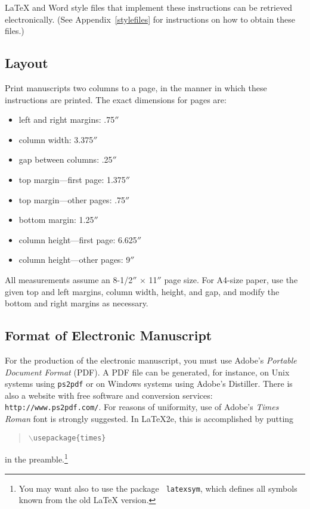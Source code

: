\documentclass{article}
\begin{document}
\LaTeX{} and Word style files that implement these instructions
can be retrieved electronically. (See Appendix~\ref{stylefiles} for
instructions on how to obtain these files.)

\subsection{Layout}

Print manuscripts two columns to a page, in the manner in which these
instructions are printed. The exact dimensions for pages are:
\begin{itemize}
\item left and right margins: .75$''$
\item column width: 3.375$''$
\item gap between columns: .25$''$
\item top margin---first page: 1.375$''$
\item top margin---other pages: .75$''$
\item bottom margin: 1.25$''$
\item column height---first page: 6.625$''$
\item column height---other pages: 9$''$
\end{itemize}

All measurements assume an 8-1/2$''$ $\times$ 11$''$ page size. For
A4-size paper, use the given top and left margins, column width,
height, and gap, and modify the bottom and right margins as necessary.

\subsection{Format of Electronic Manuscript}

For the production of the electronic manuscript, you must use Adobe's
{\em Portable Document Format} (PDF). A PDF file can be generated, for
instance, on Unix systems using {\tt ps2pdf} or on Windows systems
using Adobe's Distiller. There is also a website with free software
and conversion services: {\tt http://www.ps2pdf.com/}. For reasons of
uniformity, use of Adobe's {\em Times Roman} font is strongly suggested. In
\LaTeX2e{}, this is accomplished by putting
\begin{quote} 
\mbox{\tt $\backslash$usepackage\{times\}}
\end{quote}
in the preamble.\footnote{You may want also to use the package {\tt
latexsym}, which defines all symbols known from the old \LaTeX{}
version.}
  
\end{document}
